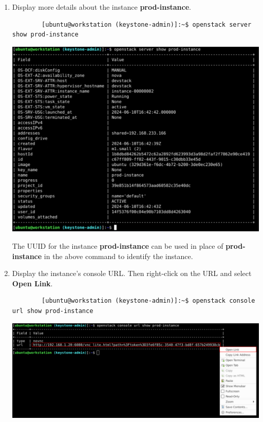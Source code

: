 \documentclass[letterpaper, 12pt]{article}
\begin{document}
\begin{enumerate}
    \item Display more details about the instance \textbf{prod-instance}.
    \begin{lstlisting}
        [ubuntu@workstation (keystone-admin)]:~$ openstack server show prod-instance
    \end{lstlisting}

    \begin{center}
        \includegraphics[width=\linewidth]{images/part2/step9.png}
    \end{center}

    \begin{tipbox}
        The UUID for the instance \textbf{prod-instance} can be used in place of \textbf{prod-instance} in the above command to identify the instance.
    \end{tipbox}

    \item Display the instance's console URL.
    Then right-click on the URL and select
    \textbf{Open Link}.
    \begin{lstlisting}
        [ubuntu@workstation (keystone-admin)]:~$ openstack console url show prod-instance
    \end{lstlisting}

    \begin{center}
        \includegraphics[width=\linewidth]{images/part2/step10.png}
    \end{center}


\end{enumerate}
\end{document}
